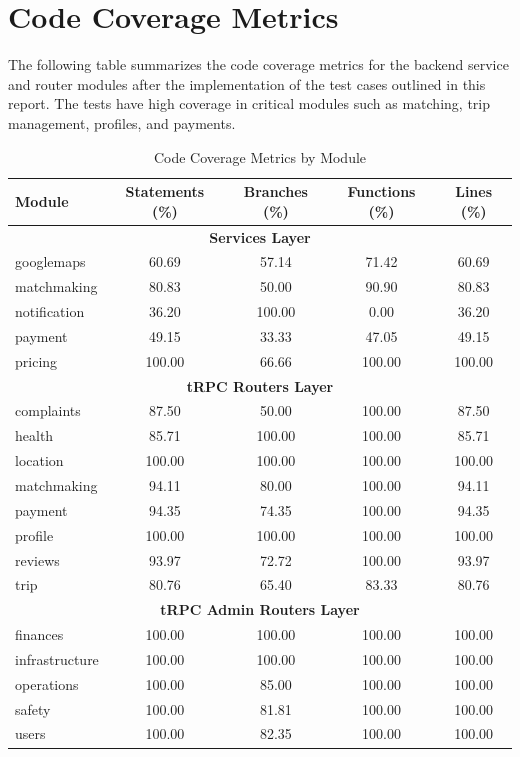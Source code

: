 \section{Code Coverage Metrics}

The following table summarizes the code coverage metrics for the backend service and router modules after the implementation of the test cases outlined in this report. The tests have high coverage in critical modules such as matching, trip management, profiles, and payments.

\begin{table}[H]
\centering
\begin{tabular}{|l|c|c|c|c|}
\hline
\textbf{Module} & \textbf{Statements (\%)} & \textbf{Branches (\%)} & \textbf{Functions (\%)} & \textbf{Lines (\%)} \\
\hline
\multicolumn{5}{|c|}{\textbf{Services Layer}} \\
\hline
googlemaps & 60.69 & 57.14 & 71.42 & 60.69 \\
\hline
matchmaking & 80.83 & 50.00 & 90.90 & 80.83 \\
\hline
notification & 36.20 & 100.00 & 0.00 & 36.20 \\
\hline
payment & 49.15 & 33.33 & 47.05 & 49.15 \\
\hline
pricing & 100.00 & 66.66 & 100.00 & 100.00 \\
\hline
\multicolumn{5}{|c|}{\textbf{tRPC Routers Layer}} \\
\hline
complaints & 87.50 & 50.00 & 100.00 & 87.50 \\
\hline
health & 85.71 & 100.00 & 100.00 & 85.71 \\
\hline
location & 100.00 & 100.00 & 100.00 & 100.00 \\
\hline
matchmaking & 94.11 & 80.00 & 100.00 & 94.11 \\
\hline
payment & 94.35 & 74.35 & 100.00 & 94.35 \\
\hline
profile & 100.00 & 100.00 & 100.00 & 100.00 \\
\hline
reviews & 93.97 & 72.72 & 100.00 & 93.97 \\
\hline
trip & 80.76 & 65.40 & 83.33 & 80.76 \\
\hline
\multicolumn{5}{|c|}{\textbf{tRPC Admin Routers Layer}} \\
\hline
finances & 100.00 & 100.00 & 100.00 & 100.00 \\
\hline
infrastructure & 100.00 & 100.00 & 100.00 & 100.00 \\
\hline
operations & 100.00 & 85.00 & 100.00 & 100.00 \\
\hline
safety & 100.00 & 81.81 & 100.00 & 100.00 \\
\hline
users & 100.00 & 82.35 & 100.00 & 100.00 \\
\hline
\end{tabular}
\caption{Code Coverage Metrics by Module}
\end{table}

